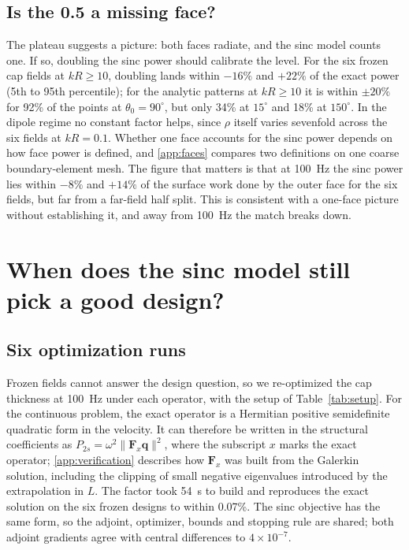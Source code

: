 \documentclass[preprint,12pt]{elsarticle}
\begin{document}
\subsection{Is the 0.5 a missing face?}
\label{sec:faces}
The plateau suggests a picture: both faces radiate, and the sinc model counts one. If so, doubling the sinc power should calibrate the level. For the six frozen cap fields at $kR\ge10$, doubling lands within $-16\%$ and $+22\%$ of the exact power (5th to 95th percentile); %
for the analytic patterns at $kR\ge10$ it is within $\pm20\%$ for 92\% of the points at $\theta_0=90^\circ$, but only 34\% at $15^\circ$ and 18\% at $150^\circ$. %
In the dipole regime no constant factor helps, since $\rho$ itself varies sevenfold across the six fields at $kR=0.1$. %
Whether one face accounts for the sinc power depends on how face power is defined, and \ref{app:faces} compares two definitions on one coarse boundary-element mesh. The figure that matters is that at 100~Hz the sinc power lies within $-8\%$ and $+14\%$ of the surface work done by the outer face for the six fields, but far from a far-field half split. %
This is consistent with a one-face picture without establishing it, and away from 100~Hz the match breaks down.

\section{When does the sinc model still pick a good design?}
\label{sec:opt}
\subsection{Six optimization runs}
\label{sec:runs}
Frozen fields cannot answer the design question, so we re-optimized the cap thickness at 100~Hz under each operator, with the setup of Table~\ref{tab:setup}. For the continuous problem, the exact operator is a Hermitian positive semidefinite quadratic form in the velocity. It can therefore be written in the structural coefficients as $P_{2s}=\omega^2\|\mathbf F_x\mathbf q\|^2$, where the subscript $x$ marks the exact operator; \ref{app:verification} describes how $\mathbf F_x$ was built from the Galerkin solution, including the clipping of small negative eigenvalues introduced by the extrapolation in $L$. %
The factor took 54~s to build and reproduces the exact solution on the six frozen designs to within 0.07\%. %
The sinc objective has the same form, so the adjoint, optimizer, bounds and stopping rule are shared; both adjoint gradients agree with central differences to $4\times10^{-7}$. %
\end{document}
